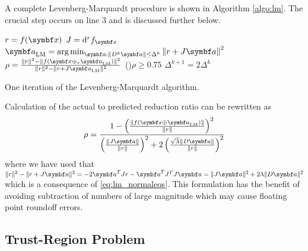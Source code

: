 A complete Levenberg-Marquardt procedure is shown in Algorithm \ref{algo:lm}. The crucial step occurs on line 3 and is discussed further below.
\begin{algorithm}
  \DontPrintSemicolon

  $r = f(\x)$\;
  $J = \mathrm{d}^r f_\x$\;
  $\a_\mathrm{LM} = \argmin_{\a : \| D^{k} \a \| \leq \Delta^{k} }\left\| r + J \a \right \|^2$ 
  $\rho = \frac{ \| r \|^2 - \| f(\x \oplus_r \a_\mathrm{LM}) \|^2 }{\| r \|^2 - \| r + J \a_\mathrm{LM} \|^2}$ 
  \ElseIf(){$\rho \geq 0.75$}{
    $\Delta^{k+1} = 2 \Delta^{k}$ 
  }
  \caption{One iteration of the Levenberg-Marquardt algorithm.}
  \label{algo:lm}
\end{algorithm}

Calculation of the actual to predicted reduction ratio can be rewritten as
\begin{equation}
  \rho = \frac{1 - \left( \frac{ \| f(\x \oplus \a_\mathrm{LM}) \|}{\|r\|} \right)^2 }{\left( \frac{\| J \a \|}{\| r \|} \right)^2 + 2 \left( \frac{\sqrt{\lambda} \| D \a \|}{\| r \|} \right)^2}
\end{equation}
where we have used that $\| r \|^2 - \| r + J \a \|^2 = -2 \a^T J r - \a^T J^T J \a = \| J \a \|^2 + 2 \lambda \| D \a \|^2$ which is a consequence of \eqref{eq:lm_normaleqs}. This formulation has the benefit of avoiding subtraction of numbers of large magnitude which may cause floating point roundoff errors.


\subsection{Trust-Region Problem}

